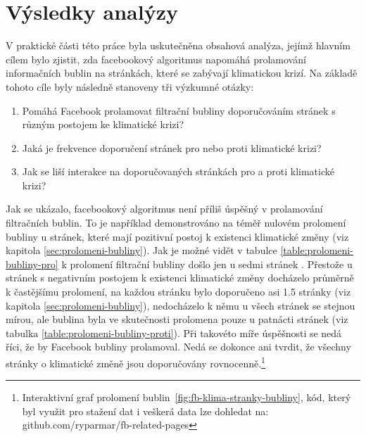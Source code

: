 \chapter{Výsledky analýzy}
\label{chapter:diskuze}
    V praktické části této práce byla uskutečněna obsahová analýza, jejímž hlav\-ním cílem bylo zjistit, zda facebookový algoritmus napomáhá prolamování informačních bublin na stránkách, které se zabývají klimatickou krizí. Na základě tohoto cíle byly následně stanoveny tři výzkumné otázky: 
    
    \begin{enumerate}
    \item Pomáhá Facebook prolamovat filtrační bubliny doporučováním stránek s různým postojem ke klimatické krizi?
    \item Jaká je frekvence doporučení stránek pro nebo proti klimatické krizi?
    \item Jak se liší interakce na doporučovaných stránkách pro a proti klimatické krizi?
    \end{enumerate}

Jak se ukázalo, facebookový algoritmus není příliš úspěšný v prolamování filtračních bublin. To je například demonstrováno na téměř nulovém prolomení bubliny u stránek, které mají pozitivní postoj k existenci klimatické změny (viz kapitola \ref{sec:prolomeni-bubliny}). Jak je možné vidět v tabulce \ref{table:prolomeni-bubliny-pro} k prolomení filtrační bubliny došlo jen u sedmi stránek . Přestože u stránek s negativním postojem k existenci klimatické změny docházelo průměrně k častějšímu prolomení, na každou stránku  bylo doporučeno asi 1.5 stránky  (viz kapitola \ref{sec:prolomeni-bubliny}), nedocházelo k němu u všech stránek se stejnou mírou, ale bublina byla ve skutečnosti prolomena pouze u patnácti stránek (viz tabulka \ref{table:prolomeni-bubliny-proti}). Při takovéto míře úspěšnosti se nedá říci, že by Facebook bubliny prolamoval. Nedá se dokonce ani tvrdit, že všechny stránky o klimatické změně jsou doporučovány rovnocenně.\footnote{Interaktivní graf prolomení bublin~\ref{fig:fb-klima-stranky-bubliny}, kód, který byl využit pro stažení dat i veškerá data lze dohledat na: github.com/ryparmar/fb-related-pages}

